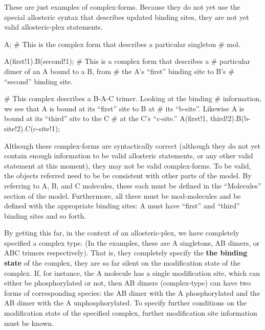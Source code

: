 These are just examples of complex-forms.  Because they do not yet use
the special allosteric syntax that describes updated binding sites,
they are not yet valid allosteric-plex statements.

\begin{ExampleMZR}

A;  # This is the complex form that describes a particular singleton
    # mol.

A(first!1).B(second!1); # This is a complex form that describes a
                        # particular dimer of an A bound to a B, from
                        # the A's ``first'' binding site to B's
                        # ``second'' binding site.

# This complex describes a B-A-C trimer.  Looking at the binding
# information, we see that A is bound at its ``first'' site to B at 
# its ``b-site''.  Likewise A is bound at its ``third'' site to the C 
# at the C's ``c-site.''
A(first!1, third!2).B(b-site!2).C(c-site!1);

\end{ExampleMZR}


Although these complex-forms are syntactically correct (although they
do not yet contain enough information to be valid allosteric
statements, or any other valid statement at this moment), they may not
be valid complex-forms.  To be valid, the objects referred need to be be
consistent with other parts of the model.  By referring to A, B, and C
molecules, these each must be defined in the ``Molecules'' section of the
model.  Furthermore, all three must be mod-molecules and be defined with
the appropriate binding sites: A must have ``first'' and ``third''
binding sites and so forth.  

By getting this far, in the context of an allosteric-plex, we have
completely specified a complex type.  (In the examples, these are A
singletons, AB dimers, or ABC trimers respectively).  That is, they
completely specify the {\bf the binding state} of the complex, they
are so far silent on the modification state of the complex.  If, for
instance, the A molecule has a single modification site, which can
either be phosphorylated or not, then AB dimers (complex-type) can
have two forms of corresponding species: the AB dimer with the A
phosphorylated and the AB dimer with the A unphosphorylated.  To
specify further conditions on the modification state of the specified
complex, further modification site information must be known.  

